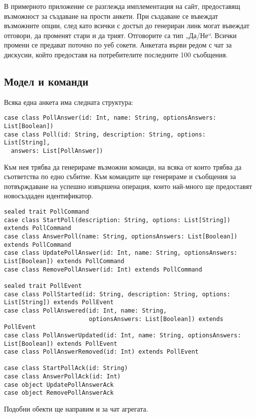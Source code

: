 В примерното приложение се разглежда имплементация на сайт, предоставящ възможност за създаване на прости анкети. При създаване се въвеждат възможните опции, след като всички с достъп до генериран линк могат въвеждат отговори, да променят стари и да трият. Отговорите са тип „Да/Не“. Всички промени се предават поточно по уеб сокети. Анкетата върви редом с чат за дискусии, който предоставя на потребителите последните 100 съобщения.

\subsection{Модел и команди}

Всяка една анкета има следната структура:

\begin{lstlisting}
case class PollAnswer(id: Int, name: String, optionsAnswers: List[Boolean])
case class Poll(id: String, description: String, options: List[String],
  answers: List[PollAnswer])
\end{lstlisting}

Към нея трябва да генерираме възможни команди, на всяка от които трябва да съответства по едно събитие. Към командите ще генерираме и съобщения за потвърждаване на успешно извършена операция, които най-много ще предоставят новосъздаден идентификатор.

\begin{lstlisting}
sealed trait PollCommand
case class StartPoll(description: String, options: List[String]) extends PollCommand
case class AnswerPoll(name: String, optionsAnswers: List[Boolean]) extends PollCommand
case class UpdatePollAnswer(id: Int, name: String, optionsAnswers: List[Boolean]) extends PollCommand
case class RemovePollAnswer(id: Int) extends PollCommand

sealed trait PollEvent
case class PollStarted(id: String, description: String, options: List[String]) extends PollEvent
case class PollAnswered(id: Int, name: String,
                        optionsAnswers: List[Boolean]) extends PollEvent
case class PollAnswerUpdated(id: Int, name: String, optionsAnswers: List[Boolean]) extends PollEvent
case class PollAnswerRemoved(id: Int) extends PollEvent

case class StartPollAck(id: String)
case class AnswerPollAck(id: Int)
case object UpdatePollAnswerAck
case object RemovePollAnswerAck
\end{lstlisting}

Подобни обекти ще направим и за чат агрегата.

